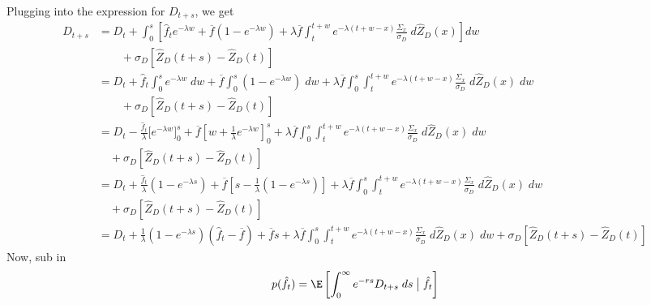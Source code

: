 \documentclass[12pt]{article}
\theoremstyle{plain}
\theoremstyle{definition}
\theoremstyle{remark}
\begin{document}
Plugging into the expression for $D_{t+s}$, we get
\begin{align*}
  D_{t+s}
  &=
  D_t
  +
  \int_0^{s}
  \left[
  \hat{f}_{t}
  e^{-\lambda w}
  +
  \overline{f}
  (1-e^{-\lambda w})
  +
  \lambda \overline{f}
  \int_t^{t+w}
  e^{-\lambda (t+w-x)}
  \frac{\Sigma_x}{\sigma_D}
  \;d\hat{Z}_D(x)
  \right]
  dw
  \\
  &\qquad
  +\sigma_D[\hat{Z}_D(t+s)-\hat{Z}_D(t)]
  \\
  &=
  D_t
  +
  \hat{f}_{t}
  \int_0^{s}
  e^{-\lambda w}
  \;dw
  +
  \overline{f}
  \int_0^{s}
  (1-e^{-\lambda w})
  \;dw
  +
  \lambda \overline{f}
  \int_0^{s}
  \int_t^{t+w}
  e^{-\lambda (t+w-x)}
  \frac{\Sigma_x}{\sigma_D}
  \;d\hat{Z}_D(x)
  \;dw
  \\
  &\qquad
  +\sigma_D[\hat{Z}_D(t+s)-\hat{Z}_D(t)]
  \\
  &=
  D_t
  -
  \frac{\hat{f}_{t}}{\lambda}
  \big[e^{-\lambda w}\big]_0^{s}
  +
  \overline{f}
  \left[w+\frac{1}{\lambda}e^{-\lambda w}\right]_0^{s}
  +
  \lambda \overline{f}
  \int_0^{s}
  \int_t^{t+w}
  e^{-\lambda (t+w-x)}
  \frac{\Sigma_x}{\sigma_D}
  \;d\hat{Z}_D(x)
  \;dw
  \\
  &\quad
  +\sigma_D[\hat{Z}_D(t+s)-\hat{Z}_D(t)]
  \\
  &=
  D_t
  +
  \frac{\hat{f}_{t}}{\lambda}
  (1-e^{-\lambda s})
  +
  \overline{f}
  \left[s-\frac{1}{\lambda}(1-e^{-\lambda s})\right]
  +
  \lambda \overline{f}
  \int_0^{s}
  \int_t^{t+w}
  e^{-\lambda (t+w-x)}
  \frac{\Sigma_x}{\sigma_D}
  \;d\hat{Z}_D(x)
  \;dw
  \\
  &\quad
  +\sigma_D[\hat{Z}_D(t+s)-\hat{Z}_D(t)]
  \\
  &=
  D_t
  +
  \frac{1}{\lambda}(1-e^{-\lambda s})
  (\hat{f}_t-\overline{f})
  + \overline{f}s
  +
  \lambda \overline{f}
  \int_0^{s}
  \int_t^{t+w}
  e^{-\lambda (t+w-x)}
  \frac{\Sigma_x}{\sigma_D}
  \;d\hat{Z}_D(x)
  \;dw
  +\sigma_D[\hat{Z}_D(t+s)-\hat{Z}_D(t)]
\end{align*}
Now, sub in
\begin{align*}
  p(\hat{f}_t)
  =
  \E\left[
    \int_{0}^\infty e^{-rs}D_{t+s}\;ds
    \;\big|\;\hat{f}_t
  \right]
\end{align*}
\end{document}

